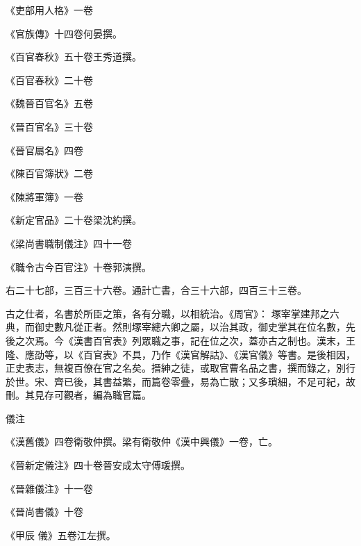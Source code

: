 \begin{pinyinscope}
 《吏部用人格》一卷



 《官族傳》十四卷何晏撰。



 《百官春秋》五十卷王秀道撰。



 《百官春秋》二十卷



 《魏晉百官名》五卷



 《晉百官名》三十卷



 《晉官屬名》四卷



 《陳百官簿狀》二卷



 《陳將軍簿》一卷



 《新定官品》二十卷梁沈約撰。



 《梁尚書職制儀注》四十一卷



 《職令古今百官注》十卷郭演撰。



 右二十七部，三百三十六卷。通計亡書，合三十六部，四百三十三卷。



 古之仕者，名書於所臣之策，各有分職，以相統治。《周官》：
 塚宰掌建邦之六典，而御史數凡從正者。然則塚宰總六卿之屬，以治其政，御史掌其在位名數，先後之次焉。今《漢書百官表》列眾職之事，記在位之次，蓋亦古之制也。漢末，王隆、應劭等，以《百官表》不具，乃作《漢官解詁》、《漢官儀》等書。是後相因，正史表志，無複百僚在官之名矣。搢紳之徒，或取官曹名品之書，撰而錄之，別行於世。宋、齊已後，其書益繁，而篇卷零疊，易為亡散；又多瑣細，不足可紀，故刪。其見存可觀者，編為職官篇。



 儀注



 《漢舊儀》四卷衛敬仲撰。梁有衛敬仲《漢中興儀》一卷，亡。



 《晉新定儀注》四十卷晉安成太守傅瑗撰。



 《晉雜儀注》十一卷



 《晉尚書儀》十卷



 《甲辰
 儀》五卷江左撰。




\end{pinyinscope}
